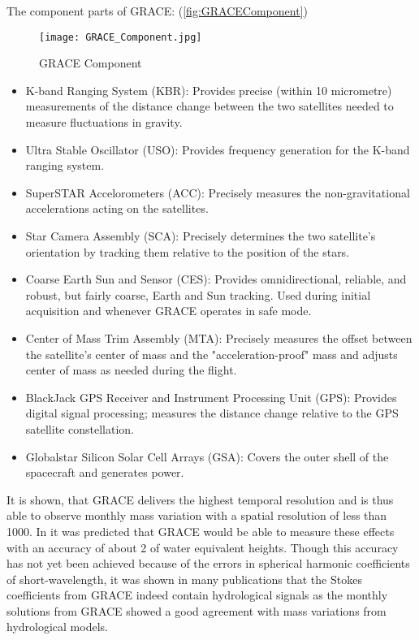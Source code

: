The component parts of GRACE: (\autoref{fig:GRACEComponent}) \cite{gracecomponent}
\begin{figure}[htbp]
	\centering
	\texttt{[image: GRACE\_Component.jpg]} 
	\caption{GRACE Component} 
	\label{fig:GRACEComponent}
\end{figure}
\begin{itemize}
	\item K-band Ranging System (KBR): Provides precise (within 10 micrometre) measurements of the distance change between the two satellites needed to measure fluctuations in gravity.
	\item Ultra Stable Oscillator (USO): Provides frequency generation for the K-band ranging system.
	\item SuperSTAR Accelorometers (ACC): Precisely measures the non-gravitational accelerations acting on the satellites.
	\item Star Camera Assembly (SCA): Precisely determines the two satellite's orientation by tracking them relative to the position of the stars.
	\item Coarse Earth Sun and Sensor (CES): Provides omnidirectional, reliable, and robust, but fairly coarse, Earth and Sun tracking. Used during initial acquisition and whenever GRACE operates in safe mode.
	\item Center of Mass Trim Assembly (MTA): Precisely measures the offset between the satellite's center of mass and the "acceleration-proof" mass and adjusts center of mass as needed during the flight.
	\item BlackJack GPS Receiver and Instrument Processing Unit (GPS): 	Provides digital signal processing; measures the distance change relative to the GPS satellite constellation.
	\item Globalstar Silicon Solar Cell Arrays (GSA): Covers the outer shell of the spacecraft and generates power.
\end{itemize}
It is shown, that GRACE delivers the highest temporal resolution and is thus able to observe monthly mass variation with a spatial resolution of less than 1000. In \cite{wahr1998time} it was predicted that GRACE would be able to measure these effects with an accuracy of about 2 of water equivalent heights. Though this accuracy has not yet been achieved because of the errors in spherical harmonic coefficients of short-wavelength, it was shown in many publications that the Stokes coefficients from GRACE indeed contain hydrological signals as the monthly solutions from GRACE showed a good agreement with mass variations from hydrological models.\\\\
